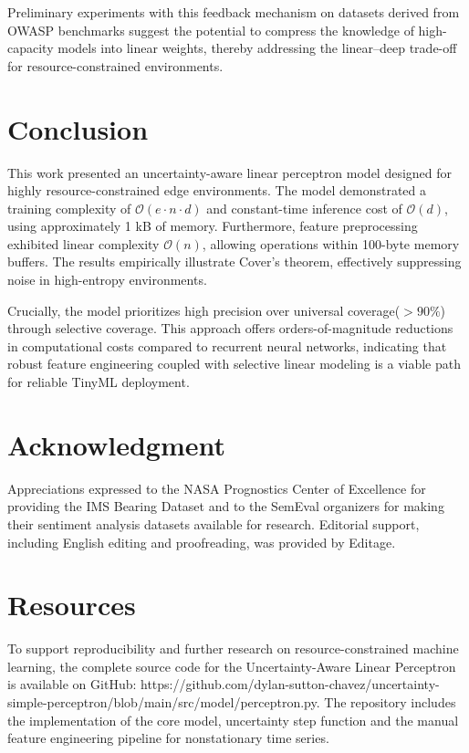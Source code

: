 \documentclass[conference]{IEEEtran}
\begin{document}
Preliminary experiments with this feedback mechanism on datasets derived from OWASP benchmarks suggest the potential to compress the knowledge of high-capacity models into linear weights, thereby addressing the linear–deep trade-off for resource-constrained environments.

\section{Conclusion}

This work presented an uncertainty-aware linear perceptron model designed for highly resource-constrained edge environments. The model demonstrated a training complexity of $\mathcal{O}(e \cdot n \cdot d)$ and constant-time inference cost of $\mathcal{O}(d)$, using approximately 1 kB of memory. Furthermore, feature preprocessing exhibited linear complexity $\mathcal{O}(n)$, allowing operations within 100-byte memory buffers. The results empirically illustrate Cover's theorem, effectively suppressing noise in high-entropy environments. 

Crucially, the model prioritizes high precision over universal coverage($>90\%$) through selective coverage. This approach offers orders-of-magnitude reductions in computational costs compared to recurrent neural networks, indicating that robust feature engineering coupled with selective linear modeling is a viable path for reliable TinyML deployment.

\section{Acknowledgment}

Appreciations expressed to the NASA Prognostics Center of Excellence for providing the IMS Bearing Dataset and to the SemEval organizers for making their sentiment analysis datasets available for research. Editorial support, including English editing and proofreading, was provided by Editage.

\section{Resources}

To support reproducibility and further research on resource-constrained machine learning, the complete source code for the Uncertainty-Aware Linear Perceptron is available on GitHub: https://github.com/dylan-sutton-chavez/uncertainty-simple-perceptron/blob/main/src/model/perceptron.py. The repository includes the implementation of the core model, uncertainty step function and the manual feature engineering pipeline for nonstationary time series.
\end{document}
